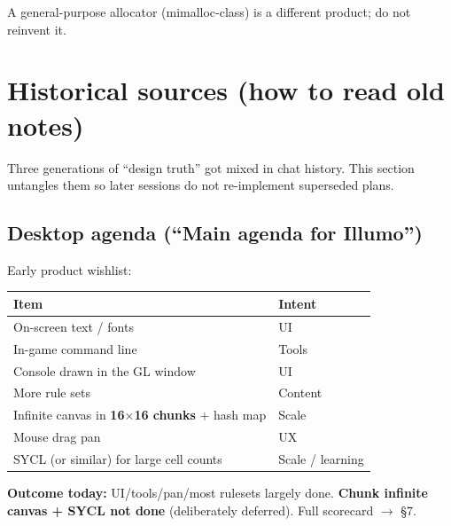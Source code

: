 \documentclass[10pt,a4paper]{article}
\begin{document}
A general-purpose allocator (mimalloc-class) is a different product; do not reinvent it.

\section{Historical sources (how to read old notes)}
Three generations of ``design truth'' got mixed in chat history. This section untangles them so later sessions do not re-implement superseded plans.

\subsection{Desktop agenda (``Main agenda for Illumo'')}
Early product wishlist:
\begin{table}[h!]
\centering
\small
\begin{tabularx}{\textwidth}{l X}
\toprule
\textbf{Item} & \textbf{Intent} \\
\midrule
On-screen text / fonts & UI \\
In-game command line & Tools \\
Console drawn in the GL window & UI \\
More rule sets & Content \\
Infinite canvas in \textbf{16$\times$16 chunks} + hash map & Scale \\
Mouse drag pan & UX \\
SYCL (or similar) for large cell counts & Scale / learning \\
\bottomrule
\end{tabularx}
\end{table}

\noindent \textbf{Outcome today:} UI/tools/pan/most rulesets largely done. \textbf{Chunk infinite canvas + SYCL not done} (deliberately deferred). Full scorecard $\rightarrow$ \S 7.
\end{document}
